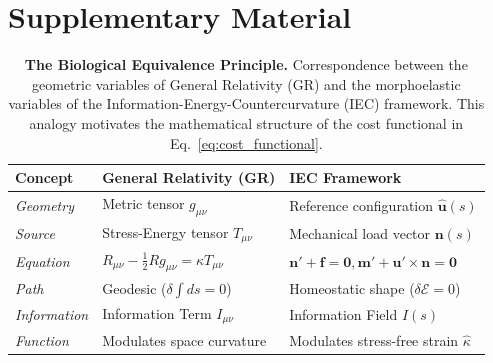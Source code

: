 \section*{Supplementary Material}

\setcounter{table}{0}
\renewcommand{\thetable}{S\arabic{table}}

\begin{table}[h!]
  \centering
  \caption{\textbf{The Biological Equivalence Principle.} Correspondence between the geometric variables of General Relativity (GR) and the morphoelastic variables of the Information-Energy-Countercurvature (IEC) framework. This analogy motivates the mathematical structure of the cost functional in Eq.~\ref{eq:cost_functional}.}
  \label{tab:gr_analogy}
  \small
  \begin{tabular}{p{3cm} p{5cm} p{5cm}}
    \toprule
    \textbf{Concept} & \textbf{General Relativity (GR)} & \textbf{IEC Framework} \\
    \midrule
    \textit{Geometry} & Metric tensor $g_{\mu\nu}$ & Reference configuration $\hat{\mathbf{u}}(s)$ \\
    \textit{Source} & Stress-Energy tensor $T_{\mu\nu}$ & Mechanical load vector $\mathbf{n}(s)$ \\
    \textit{Equation} & $R_{\mu\nu} - \frac{1}{2}Rg_{\mu\nu} = \kappa T_{\mu\nu}$ & $\mathbf{n}' + \mathbf{f} = \mathbf{0}, \mathbf{m}' + \mathbf{u}' \times \mathbf{n} = \mathbf{0}$ \\
    \textit{Path} & Geodesic ($\delta \int ds = 0$) & Homeostatic shape ($\delta \mathcal{E} = 0$) \\
    \textit{Information} & Information Term $I_{\mu\nu}$ & Information Field $I(s)$ \\
    \textit{Function} & Modulates space curvature & Modulates stress-free strain $\hat{\kappa}$ \\
    \bottomrule
  \end{tabular}
\end{table}

